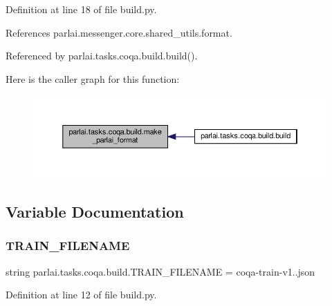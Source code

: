 Definition at line 18 of file build.\+py.



References parlai.\+messenger.\+core.\+shared\+\_\+utils.\+format.



Referenced by parlai.\+tasks.\+coqa.\+build.\+build().

Here is the caller graph for this function\+:
\nopagebreak
\begin{figure}[H]
\begin{center}
\leavevmode
\includegraphics[width=350pt]{namespaceparlai_1_1tasks_1_1coqa_1_1build_ae2bc52f1ecab4681f1c2ebf013629aec_icgraph}
\end{center}
\end{figure}


\subsection{Variable Documentation}
\mbox{\label{namespaceparlai_1_1tasks_1_1coqa_1_1build_a9e8bb09b2205ec40d8d664394cfbbb5a}} 
\subsubsection{\texorpdfstring{T\+R\+A\+I\+N\+\_\+\+F\+I\+L\+E\+N\+A\+ME}{TRAIN\_FILENAME}}
{\footnotesize\ttfamily string parlai.\+tasks.\+coqa.\+build.\+T\+R\+A\+I\+N\+\_\+\+F\+I\+L\+E\+N\+A\+ME = \textquotesingle{}coqa-\/train-\/v1..\+json\textquotesingle{}}



Definition at line 12 of file build.\+py.

\mbox{\label{namespaceparlai_1_1tasks_1_1coqa_1_1build_adef1f0121b56206dff92bc3d0c20189d}} 

